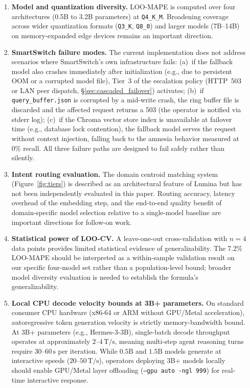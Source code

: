 \documentclass[11pt,a4paper]{article}
\newcommand{\Ts}{\,\mathrm{T/s}}
\newcommand{\su}{\,\mathrm{s}}
\newcommand{\code}[1]{\texttt{#1}}
\begin{document}
\begin{enumerate}[leftmargin=*]
\item \textbf{Model and quantization diversity.} LOO-MAPE is computed over four architectures (0.5B to 3.2B parameters) at \code{Q4\_K\_M}. Broadening coverage across wider quantization formats (\code{Q3\_K}, \code{Q8\_0}) and larger models (7B--14B) on memory-expanded edge devices remains an important direction.
\item \textbf{SmartSwitch failure modes.} The current implementation does not address scenarios where SmartSwitch's own infrastructure fails: (a)~if the fallback model also crashes immediately after initialization (e.g., due to persistent OOM or a corrupted model file), Tier~3 of the escalation policy (HTTP~503 or LAN peer dispatch, \S\ref{sec:cascaded_failover}) activates; (b)~if \code{query\_buffer.json} is corrupted by a mid-write crash, the ring buffer file is discarded and the affected request returns a 503 (the operator is notified via stderr log); (c)~if the Chroma vector store index is unavailable at failover time (e.g., database lock contention), the fallback model serves the request without context injection, falling back to the amnesia behavior measured at $0\%$ recall. All three failure paths are designed to fail safely rather than silently.
\item \textbf{Intent routing evaluation.} The domain centroid matching system (Figure~\ref{fig:tiers}) is described as an architectural feature of Lumina but has not been independently evaluated in this paper. Routing accuracy, latency overhead of the embedding step, and the end-to-end quality benefit of domain-specific model selection relative to a single-model baseline are important directions for follow-on work.
\item \textbf{Statistical power of LOO-CV.} A leave-one-out cross-validation with $n=4$ data points provides limited statistical evidence of generalizability. The 7.2\% LOO-MAPE should be interpreted as a within-sample validation result on our specific four-model set rather than a population-level bound; broader model diversity evaluation is needed to establish the formula's generalizability.
\item \textbf{Local CPU decode velocity bounds at 3B+ parameters.} On standard consumer CPU hardware (x86-64 or ARM without GPU/Metal acceleration), autoregressive token generation velocity is strictly memory-bandwidth bound. At 3B+ parameters (e.g., Hermes-3-3B), single-batch decode throughput operates at approximately $2$--$4\Ts$, meaning multi-step agent reasoning turns require $30$--$60\su$ per iteration. While $0.5\mathrm{B}$ and $1.5\mathrm{B}$ models generate at interactive speeds ($20$--$50\Ts$), operators deploying 3B+ models locally should enable GPU/Metal layer offloading (\code{--gpu auto -ngl 999}) for real-time interactive response.

\end{enumerate}
\end{document}
